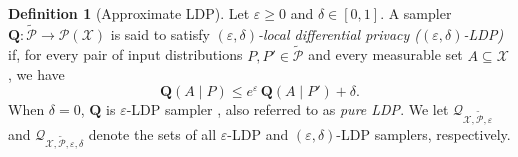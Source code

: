 \documentclass[accepted]{article}
\theoremstyle{plain} %
\theoremstyle{definition}
\newtheorem{definition}{Definition}[section]
\theoremstyle{remark}
\newcommand{\eps}{\varepsilon}
\newcommand{\bQ}{\mathbf{Q}}
\newcommand{\SA}[1]{\textbf{\textcolor{Magenta}{[#1]}}}
\newcommand{\HG}[1]{\textcolor{cyan}{[#1]}}
\begin{document}

\begin{definition}[Approximate LDP]
\label{def:approx-LDP}
Let $\varepsilon \geq 0$ and $\delta \in [0,1]$.  
A sampler $\mathbf{Q}: \tilde{\mathcal{P}} \to \mathcal{P}(\mathcal{X})$ is said to satisfy \emph{$(\varepsilon,\delta)$-local differential privacy ($( \varepsilon,\delta)$-LDP)} if, for every pair of input distributions $P, P' \in \tilde{\mathcal{P}}$ and every measurable set $A \subseteq \mathcal{X}$, we have
\[
\mathbf{Q}(A \mid P) \leq e^{\varepsilon} \, \mathbf{Q}(A \mid P') + \delta.
\]
When $\delta = 0$, $\mathbf{Q}$ is $\eps$-LDP sampler \cite{husain2020local}, also referred to as \emph{pure LDP}. We let $\mathcal{Q}_{\mathcal{X}, \tilde{\mathcal{P}}, \varepsilon}$ and $\mathcal{Q}_{\mathcal{X}, \tilde{\mathcal{P}}, \varepsilon, \delta}$ denote the sets of all $\varepsilon$-LDP and $(\varepsilon, \delta)$-LDP samplers, respectively.

\end{definition}


\end{document}
